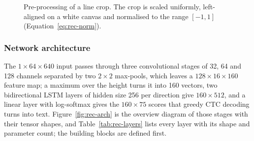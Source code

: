 \begin{figure}[h]
\centering
{}
\caption{Pre-processing of a line crop. The crop is scaled uniformly, left-aligned on a white canvas and normalised to the range $[-1,1]$ (Equation~\ref{eq:rec-norm}).}
\label{fig:rec-canvas}
\end{figure}


\subsubsection{Network architecture}

The $1\times64\times640$ input passes through three convolutional stages of 32, 64 and 128 channels separated by two $2\times2$ max-pools, which leaves a $128\times16\times160$ feature map; a maximum over the height turns it into 160 vectors, two bidirectional LSTM layers of hidden size 256 per direction give $160\times512$, and a linear layer with log-softmax gives the $160\times75$ scores that greedy CTC decoding turns into text.
Figure~\ref{fig:rec-arch} is the overview diagram of those stages with their tensor shapes, and Table~\ref{tab:rec-layers} lists every layer with its shape and parameter count; the building blocks are defined first.

